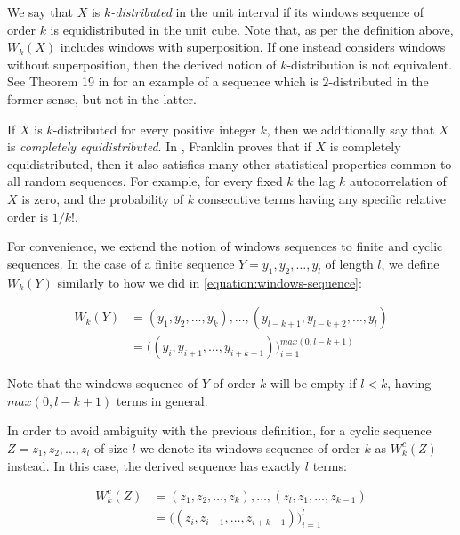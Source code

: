 \documentclass[11pt,a4paper]{tesis}
\theoremstyle{plain}
\theoremstyle{definition}
\begin{document}
We say that $X$ is \textit{$k$-distributed} in the unit interval if its windows sequence of order $k$ is equidistributed in the unit cube. Note that, as per the definition above, $W_k(X)$ includes windows with superposition. If one instead considers windows without superposition, then the derived notion of $k$-distribution is not equivalent. See Theorem 19 in \cite{franklin-1963} for an example of a sequence which is $2$-distributed in the former sense, but not in the latter.

If $X$ is $k$-distributed for every positive integer $k$, then we additionally say that $X$ is \textit{completely equidistributed}. In \cite{franklin-1963}, Franklin proves that if $X$ is completely equidistributed, then it also satisfies many other statistical properties common to all random sequences. For example,  for every fixed $k$ the lag $k$ autocorrelation of $X$ is zero, and the probability of $k$ consecutive terms having any specific relative order is $1 / k!$.

For convenience, we extend the notion of windows sequences to finite and cyclic sequences. In the case of a finite sequence $Y = y_1, y_2, \dots, y_l$ of length $l$, we define $W_k(Y)$ similarly to how we did in \ref{equation:windows-sequence}:

\begin{equation*}
  \begin{aligned}
    W_k(Y) & = (y_1, y_2, \dots, y_k), \dots, (y_{l - k + 1}, y_{l - k + 2}, \dots, y_l) \\
             & = \big( (y_i, y_{i + 1}, \dots, y_{i + k - 1}) \big)_{i = 1}^{max(0, l - k + 1)}
  \end{aligned}
\end{equation*}

Note that the windows sequence of $Y$ of order $k$ will be empty if $l < k$, having $max(0, l - k + 1)$ terms in general.

In order to avoid ambiguity with the previous definition, for a cyclic sequence $Z = z_1, z_2, \dots, z_l$ of size $l$ we denote its windows sequence of order $k$ as $W_k^{c}(Z)$ instead. In this case, the derived sequence has exactly $l$ terms:

\begin{equation*}
  \begin{aligned}
    W_k^{c}(Z) & = (z_1, z_2, \dots, z_k), \dots, (z_l, z_1, \dots, z_{k - 1}) \\
             & = \big( (z_i, z_{i + 1}, \dots, z_{i + k - 1}) \big)_{i = 1}^{l}
  \end{aligned}
\end{equation*}
\end{document}
